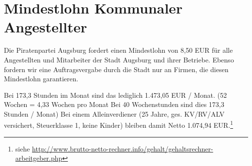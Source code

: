   \section{Mindestlohn Kommunaler Angestellter}
  
  Die Piratenpartei Augsburg fordert einen Mindestlohn von 8,50 EUR für alle 
  Angestellten und Mitarbeiter der Stadt Augsburg und ihrer Betriebe. Ebenso 
  fordern wir eine Auftragsvergabe durch die Stadt nur an Firmen, die diesen 
  Mindestlohn garantieren.
  
  Bei 173,3 Stunden im Monat sind das lediglich 1.473,05 EUR / Monat. (52 
  Wochen = 4,33 Wochen pro Monat Bei 40 Wochenstunden sind dies 173,3 Stunden 
  / Monat) Bei einem Alleinverdiener (25 Jahre, ges. KV/RV/ALV versichert, 
  Steuerklasse 1, keine Kinder) bleiben damit Netto 1.074,94 
  EUR.\footnote{siehe 
  \url{http://www.brutto-netto-rechner.info/gehalt/gehaltsrechner-arbeitgeber.php}}
   
  